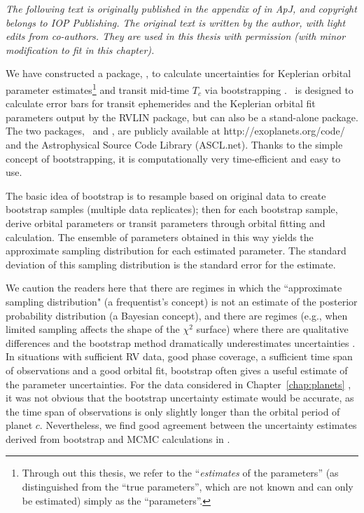 {\it
  The following text is originally published in the appendix of
  \cite{wang2012} in {\it ApJ}, and copyright belongs to IOP
  Publishing. The original text is written by the author, with light
  edits from co-authors. They are used in this thesis with permission (with
  minor modification to fit in this chapter). 
}

We have constructed a package, \boottran, to calculate uncertainties
for Keplerian orbital parameter estimates\footnote{Through out this
  thesis, we refer to the ``{\it estimates} of the parameters'' (as
  distinguished from the ``true parameters'', which are not known and
  can only be estimated) simply as the ``parameters''.} and transit
mid-time $T_c$ via bootstrapping
\citep{1981,davison1997bootstrap}. \boottran\ is designed to calculate
error bars for transit ephemerides and the Keplerian orbital fit
parameters output by the RVLIN package\citep{rvlin}, but can also be a
stand-alone package. The two packages, \rvlin\ and \boottran, are
publicly available at http://exoplanets.org/code/ and the
Astrophysical Source Code Library (ASCL.net). Thanks to the simple
concept of bootstrapping, it is computationally very time-efficient
and easy to use.

The basic idea of bootstrap is to resample based on original data
to create bootstrap samples (multiple data replicates); then for
each bootstrap sample, derive orbital parameters or transit parameters
through orbital fitting and calculation. The ensemble of parameters
obtained in this way yields the approximate sampling distribution for
each estimated parameter. The standard deviation of this sampling
distribution is the standard error for the estimate.

We caution the readers here that there are regimes in which the
``approximate sampling distribution" (a frequentist's concept) is not
an estimate of the posterior probability distribution (a Bayesian
concept), and there are regimes (e.g., when limited sampling affects
the shape of the $\chi^2$ surface) where there are qualitative
differences and the bootstrap method dramatically underestimates
uncertainties \citep[e.g., long-period planets when the observations
  are not yet sufficient to pin down the orbital
  period;][]{Ford2005,Bender2012}. In situations with sufficient RV
data, good phase coverage, a sufficient time span of observations and
a good orbital fit, bootstrap often gives a useful estimate of the
parameter uncertainties. For the data considered in
Chapter~\ref{chap:planets} \citep{wang2012}, it was not obvious that
the bootstrap uncertainty estimate would be accurate, as the time span
of observations is only slightly longer than the orbital period of
planet $c$. Nevertheless, we find good agreement between the
uncertainty estimates derived from bootstrap and MCMC calculations in
\cite{wang2012}.

